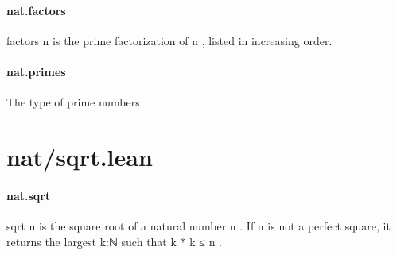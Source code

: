 \documentclass{article}
\begin{document}
\paragraph{nat.factors}
\par
\colorbox[RGB]{253,246,227}{{{{\color[RGB]{101, 123, 131} factors n }}}} is the prime factorization of 
\colorbox[RGB]{253,246,227}{{{{\color[RGB]{101, 123, 131} n }}}}, listed in increasing order.
\paragraph{nat.primes}
\par
The type of prime numbers
\section{nat/sqrt.lean}\paragraph{nat.sqrt}
\par
\colorbox[RGB]{253,246,227}{{{{\color[RGB]{101, 123, 131} sqrt n }}}} is the square root of a natural number 
\colorbox[RGB]{253,246,227}{{{{\color[RGB]{101, 123, 131} n }}}}. If 
\colorbox[RGB]{253,246,227}{{{{\color[RGB]{101, 123, 131} n }}}} is not a
perfect square, it returns the largest 
\colorbox[RGB]{253,246,227}{{{{\color[RGB]{101, 123, 131} k:ℕ }}}} such that 
\colorbox[RGB]{253,246,227}{{{{\color[RGB]{101, 123, 131} k }}}{{{\color[RGB]{181, 137, 0} * }}}{{{\color[RGB]{101, 123, 131} k  }}}{{{\color[RGB]{181, 137, 0} ≤ }}}{{{\color[RGB]{101, 123, 131}  n }}}}.
\end{document}
